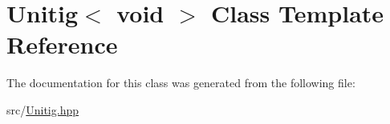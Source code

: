 \hypertarget{classUnitig_3_01void_01_4}{}\section{Unitig$<$ void $>$ Class Template Reference}
\label{classUnitig_3_01void_01_4}


The documentation for this class was generated from the following file\+:\begin{DoxyCompactItemize}
\item 
src/\hyperlink{Unitig_8hpp}{Unitig.\+hpp}\end{DoxyCompactItemize}

